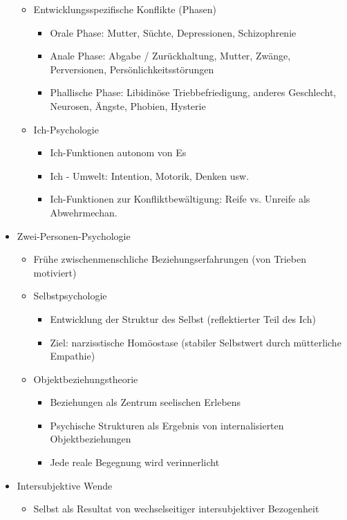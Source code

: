 \documentclass[11pt, paper=a4, twocolumn]{scrartcl}
\begin{document}
\begin{itemize}
\begin{itemize}
					\item Entwicklungsspezifische Konflikte (Phasen)
						\begin{itemize}
							\item Orale Phase: Mutter, Süchte, Depressionen, Schizophrenie
							\item Anale Phase: Abgabe / Zurückhaltung, Mutter, Zwänge, Perversionen, Persönlichkeitsstörungen
							\item Phallische Phase: Libidinöse Triebbefriedigung, anderes Geschlecht, Neurosen, Ängste, 
								Phobien, Hysterie
						\end{itemize}
					\item Ich-Psychologie
						\begin{itemize}
							\item Ich-Funktionen autonom von Es
							\item Ich - Umwelt: Intention, Motorik, Denken usw.
							\item Ich-Funktionen zur Konfliktbewältigung: Reife vs. Unreife als Abwehrmechan.
						\end{itemize}
				\end{itemize}
			\item Zwei-Personen-Psychologie
				\begin{itemize}
					\item Frühe zwischenmenschliche Beziehungserfahrungen (von Trieben motiviert)
					\item Selbstpsychologie
						\begin{itemize}
							\item Entwicklung der Struktur des Selbst (reflektierter Teil des Ich)
							\item Ziel: narzisstische Homöostase (stabiler Selbstwert durch mütterliche Empathie)
						\end{itemize}
					\item Objektbeziehungstheorie
						\begin{itemize}
							\item Beziehungen als Zentrum seelischen Erlebens
							\item Psychische Strukturen als Ergebnis von internalisierten Objektbeziehungen
							\item Jede reale Begegnung wird verinnerlicht
						\end{itemize}
				\end{itemize}
			\item Intersubjektive Wende
				\begin{itemize}
					\item Selbst als Resultat von wechselseitiger intersubjektiver Bezogenheit

\end{itemize}
\end{itemize}
\end{document}
